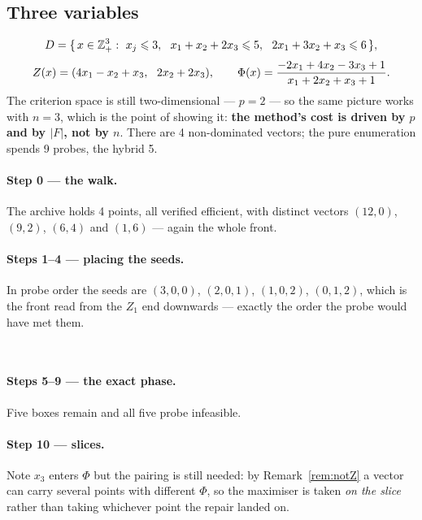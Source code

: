 \documentclass[11pt,a4paper]{article}
\begin{document}
\subsection{Three variables}
\label{sec:exB}

\[
  D = \{\, x \in \mathbb{Z}^{3}_{+} :\ x_j \leqslant 3,\ \
  x_1 + x_2 + 2x_3 \leqslant 5,\ \ 2x_1 + 3x_2 + x_3 \leqslant 6 \,\},
\]
\[
  \Z(x) = (4x_1 - x_2 + x_3,\ \ 2x_2 + 2x_3), \qquad
  \Phi(x) = \frac{-2x_1 + 4x_2 - 3x_3 + 1}{x_1 + 2x_2 + x_3 + 1} .
\]
The criterion space is still two-dimensional --- $p = 2$ --- so the same
picture works with $n = 3$, which is the point of showing it: \textbf{the
method's cost is driven by $p$ and by $|F|$, not by $n$}.  There are 4
non-dominated vectors; the pure enumeration spends 9 probes, the hybrid 5.

\paragraph{Step 0 --- the walk.}  The archive holds 4 points, all verified
efficient, with distinct vectors $(12,0)$, $(9,2)$, $(6,4)$ and $(1,6)$ ---
again the whole front.

\begin{center}\end{center}

\paragraph{Steps 1--4 --- placing the seeds.}  In probe order the seeds are
$(3,0,0)$, $(2,0,1)$, $(1,0,2)$, $(0,1,2)$, which is the front read from the
$Z_1$ end downwards --- exactly the order the probe would have met them.

\begin{center}
\quad{}\\[4pt]
\quad{}
\end{center}

\paragraph{Steps 5--9 --- the exact phase.}  Five boxes remain and all five
probe infeasible.

\begin{center}\end{center}

\paragraph{Step 10 --- slices.}  Note $x_3$ enters $\Phi$ but the pairing is
still needed: by Remark~\ref{rem:notZ} a vector can carry several points with
different $\Phi$, so the maximiser is taken \emph{on the slice} rather than
taking whichever point the repair landed on.
\end{document}
